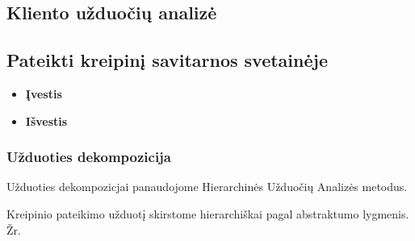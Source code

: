 \subsection {Kliento užduočių analizė}

	\subsection {Pateikti kreipinį savitarnos svetainėje}
		
		\begin{itemize}
			\item \textbf{Įvestis}
			\item \textbf{Išvestis} 
		\end{itemize}

	\subsubsection {Užduoties dekompozicija}

	Užduoties dekompozicjai panaudojome Hierarchinės Užduočių Analizės metodus.
 		

	Kreipinio pateikimo užduotį skirstome hierarchiškai pagal abstraktumo lygmenis. Žr. 

